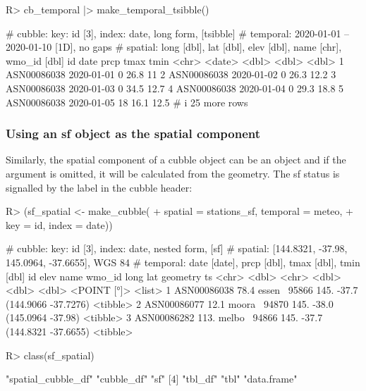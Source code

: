 \documentclass[
  shortnames]{jss}
\begin{document}
\begin{CodeChunk}
\begin{CodeInput}
R> cb_temporal |> make_temporal_tsibble() 
\end{CodeInput}
\begin{CodeOutput}
# cubble:   key: id [3], index: date, long form, [tsibble]
# temporal: 2020-01-01 -- 2020-01-10 [1D], no gaps
# spatial:  long [dbl], lat [dbl], elev [dbl], name [chr], wmo_id [dbl]
  id          date        prcp  tmax  tmin
  <chr>       <date>     <dbl> <dbl> <dbl>
1 ASN00086038 2020-01-01     0  26.8  11  
2 ASN00086038 2020-01-02     0  26.3  12.2
3 ASN00086038 2020-01-03     0  34.5  12.7
4 ASN00086038 2020-01-04     0  29.3  18.8
5 ASN00086038 2020-01-05    18  16.1  12.5
# i 25 more rows
\end{CodeOutput}
\end{CodeChunk}

\hypertarget{using-an-sf-object-as-the-spatial-component}{%
\subsubsection{Using an sf object as the spatial component}\label{using-an-sf-object-as-the-spatial-component}}

Similarly, the spatial component of a cubble object can be an  object and if the  argument is omitted, it will be calculated from the  geometry. The sf status is signalled by the \code{[sf]} label in the cubble header:

\begin{CodeChunk}
\begin{CodeInput}
R> (sf_spatial <- make_cubble(
+   spatial = stations_sf, temporal = meteo, 
+   key = id, index = date))
\end{CodeInput}
\begin{CodeOutput}
# cubble:   key: id [3], index: date, nested form, [sf]
# spatial:  [144.8321, -37.98, 145.0964, -37.6655], WGS 84
# temporal: date [date], prcp [dbl], tmax [dbl], tmin [dbl]
  id           elev name   wmo_id  long   lat            geometry ts      
  <chr>       <dbl> <chr>   <dbl> <dbl> <dbl>         <POINT [°]> <list>  
1 ASN00086038  78.4 essen~  95866  145. -37.7 (144.9066 -37.7276) <tibble>
2 ASN00086077  12.1 moora~  94870  145. -38.0   (145.0964 -37.98) <tibble>
3 ASN00086282 113.  melbo~  94866  145. -37.7 (144.8321 -37.6655) <tibble>
\end{CodeOutput}
\begin{CodeInput}
R> class(sf_spatial)
\end{CodeInput}
\begin{CodeOutput}
[1] "spatial_cubble_df" "cubble_df"         "sf"               
[4] "tbl_df"            "tbl"               "data.frame"       
\end{CodeOutput}
\end{CodeChunk}
\end{document}
